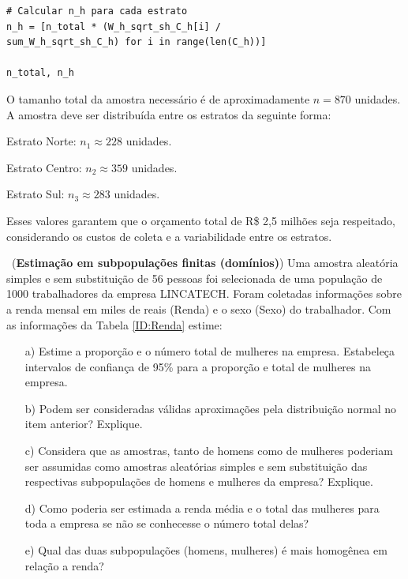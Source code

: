 \documentclass[a4paper,12pt,oneside,twocolumn]{Config/milktest}
\begin{document}
{\begin{itemize}
\begin{verbatim}
# Calcular n_h para cada estrato
n_h = [n_total * (W_h_sqrt_sh_C_h[i] / 
sum_W_h_sqrt_sh_C_h) for i in range(len(C_h))]

n_total, n_h
\end{verbatim}
O tamanho total da amostra necessário é de aproximadamente \( n = 870 \) unidades.
A amostra deve ser distribuída entre os estratos da seguinte forma:

Estrato Norte: \( n_1 \approx 228 \) unidades.

Estrato Centro: \( n_2 \approx 359 \) unidades.

Estrato Sul: \( n_3 \approx 283 \) unidades.

Esses valores garantem que o orçamento total de R\$ 2,5 milhões seja respeitado, considerando os custos de coleta e a variabilidade entre os estratos.

\end{itemize}
}

\medskip 
\question~({\bf Estimação em subpopulações finitas (domínios)}) Uma amostra aleatória simples e sem substituição de 56 pessoas foi selecionada de uma população de 1000 trabalhadores da empresa LINCATECH. Foram coletadas informações sobre a renda mensal em miles de reais (Renda) e o sexo (Sexo) do trabalhador. Com as informações da Tabela \ref{ID:Renda} estime:

\begin{itemize}
\item[a)] Estime a proporção e o número total de mulheres na empresa. Estabeleça intervalos de confiança de 95\% para a proporção e total de mulheres na empresa.
\item[b)] Podem ser consideradas válidas aproximações pela distribuição normal no item anterior? Explique.
\item[c)] Considera que as amostras, tanto de homens como de mulheres poderiam ser assumidas como amostras aleatórias simples e sem substituição das respectivas subpopulações de homens e mulheres da empresa? Explique.
\item[d)] Como poderia ser estimada a renda média e o total das mulheres para toda a empresa se não se conhecesse  o número total delas?
\item[e)] Qual das duas subpopulações (homens, mulheres) é mais homogênea em relação a renda?
\end{itemize}
\end{document}
